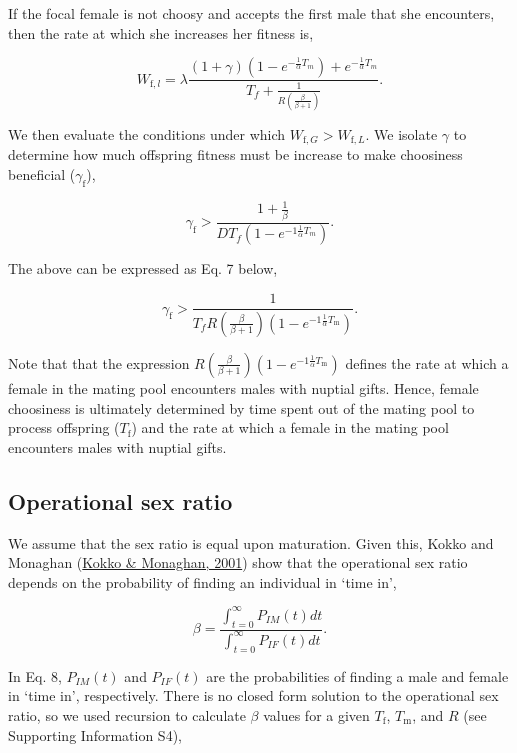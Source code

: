 \documentclass[
]{article}
\begin{document}
If the focal female is not choosy and accepts the first male that she
encounters, then the rate at which she increases her fitness is,

\[W_{\mathrm{f},l} = \lambda \frac{\left(1 + \gamma\right)\left(1 - e^{-\frac{1}{\alpha}T_{m}}\right) + e^{-\frac{1}{\alpha}T_{m}}}{T_{f} + \frac{1}{R \left(\frac{\beta}{\beta + 1}\right)}}.\]

We then evaluate the conditions under which
\(W_{\mathrm{f}, G} > W_{\mathrm{f}, L}\). We isolate \(\gamma\) to
determine how much offspring fitness must be increase to make choosiness
beneficial (\(\gamma_{\mathrm{f}}\)),

\[\gamma_{\mathrm{f}} > \frac{1 + \frac{1}{\beta}}{D T_{f} \left(1 - e^{-1\frac{1}{\alpha}T_{m}}\right)}.\]

The above can be expressed as Eq. 7 below,

\begin{equation}
\gamma_{\mathrm{f}} > \frac{1}{ T_{f} R\left(\frac{\beta}{\beta + 1}\right) \left(1 - e^{-1\frac{1}{\alpha}T_{\mathrm{m}}}\right)}.
\end{equation}

Note that that the expression
\(R\left(\frac{\beta}{\beta + 1}\right) \left(1 - e^{-1\frac{1}{\alpha}T_{\mathrm{m}}}\right)\)
defines the rate at which a female in the mating pool encounters males
with nuptial gifts. Hence, female choosiness is ultimately determined by
time spent out of the mating pool to process offspring
(\(T_{\mathrm{f}}\)) and the rate at which a female in the mating pool
encounters males with nuptial gifts.

\hypertarget{operational-sex-ratio}{%
\subsection{Operational sex ratio}\label{operational-sex-ratio}}

We assume that the sex ratio is equal upon maturation. Given this, Kokko
and Monaghan (\protect\hyperlink{ref-Kokko2001}{Kokko \& Monaghan,
2001}) show that the operational sex ratio depends on the probability of
finding an individual in `time in',

\begin{equation}
\beta = \frac{\int_{t = 0}^{\infty} P_{IM}(t)dt}{\int_{t = 0}^{\infty} P_{IF}(t)dt}.
\end{equation}

In Eq. 8, \(P_{IM}(t)\) and \(P_{IF}(t)\) are the probabilities of
finding a male and female in `time in', respectively. There is no closed
form solution to the operational sex ratio, so we used recursion to
calculate \(\beta\) values for a given \(T_{\mathrm{f}}\),
\(T_{\mathrm{m}}\), and \(R\) (see Supporting Information S4),
\end{document}

